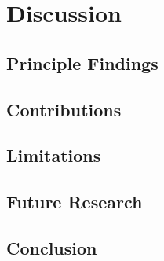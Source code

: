 \section{Discussion}

\subsection{Principle Findings}

\subsection{Contributions}

\subsection{Limitations}

\subsection{Future Research}

\subsection{Conclusion}